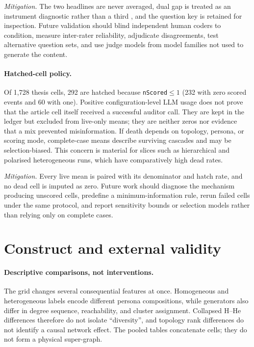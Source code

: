 \emph{Mitigation.}  The two headlines are never averaged, dual gap is treated
as an instrument diagnostic rather than a third \MPR{}, and the question key
is retained for inspection.  Future validation should blind independent human
coders to condition, measure inter-rater reliability, adjudicate disagreements,
test alternative question sets, and use judge models from model families not
used to generate the content.

\paragraph{Hatched-cell policy.}
Of 1,728 thesis cells, 292 are hatched because
\texttt{nScored}$\leq 1$ (232 with zero scored events and 60 with one).
Positive configuration-level LLM usage does not prove that the article cell
itself received a successful auditor call.  They are kept in the ledger
but excluded from live-only means; they are neither zeros nor evidence that a
mix prevented misinformation.  If death depends on topology, persona, or
scoring mode, complete-case means describe surviving cascades and may be
selection-biased.  This concern is material for slices such as hierarchical
and polarised heterogeneous runs, which have comparatively high dead rates.

\emph{Mitigation.}  Every live mean is paired with its denominator and hatch
rate, and no dead cell is imputed as zero.  Future work should diagnose the
mechanism producing unscored cells, predefine a minimum-information rule,
rerun failed cells under the same protocol, and report sensitivity bounds or
selection models rather than relying only on complete cases.

\section{Construct and external validity}

\paragraph{Descriptive comparisons, not interventions.}
The grid changes several consequential features at once.  Homogeneous and
heterogeneous labels encode different persona compositions, while generators
also differ in degree sequence, reachability, and cluster assignment.
Collapsed H--He differences therefore do not isolate \enquote{diversity}, and
topology rank differences do not identify a causal network effect.  The
pooled tables concatenate cells; they do not form a physical super-graph.

